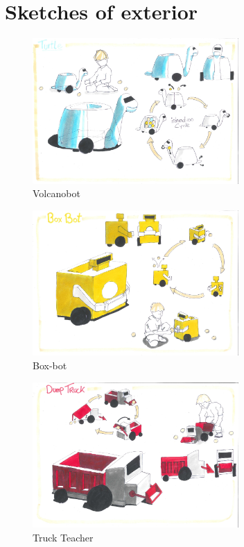 \documentclass[11pt,twoside,a4paper]{report}
\begin{document}
\section{Sketches of exterior}
\begin{figure}[H]
  \begin{center}
    \includegraphics[width=0.70\textwidth]{Images/VolcanoBotConcept.pdf}
  \end{center}
  \caption{Volcanobot}
  \label{figure:volcanobot2}
\end{figure}
\begin{figure}
  \begin{center}
    \includegraphics[width=0.70\textwidth]{Images/BoxBotConcept.pdf}
  \end{center}
  \caption{Box-bot}
  \label{figure:boxbot2}
\end{figure}
\begin{figure}
  \begin{center}
    \includegraphics[width=0.70\textwidth]{Images/TruckTeacherConcept.pdf}
  \end{center}
  \caption{Truck Teacher}
  \label{figure:truckteacher2}
\end{figure}
\end{document}
